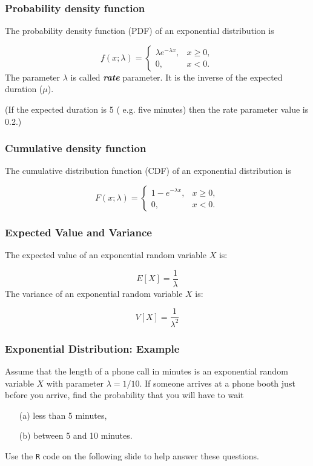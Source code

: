 \documentclass[a4]{beamer}
\begin{document}
\begin{frame}[fragile]
\frametitle{Probability density function}
The probability density function (PDF) of an exponential distribution is

\[
f(x;\lambda) = \begin{cases}
\lambda e^{-\lambda x}, & x \ge 0, \\
0, & x < 0.
\end{cases}\]
The parameter $\lambda$  is called \textbf{\emph{rate}} parameter. It is the inverse of the expected duration ($\mu$).\\ \bigskip

(If the expected duration is 5 ( e.g. five minutes) then the rate parameter value is 0.2.)
\end{frame}

\begin{frame}[fragile]
\frametitle{Cumulative density function}
The cumulative distribution function (CDF) of an exponential distribution is

\[
F(x;\lambda) = \begin{cases}
1-e^{-\lambda x}, & x \ge 0, \\
0, & x < 0.
\end{cases}\]

\end{frame}

\begin{frame}[fragile]
\frametitle{Expected Value and Variance}
The expected value of an exponential random variable $X$ is:

\[
E[X] = \frac{1}{\lambda}\]
The variance of an exponential random variable $X$ is:

\[
V[X] = \frac{1}{\lambda^2}\]

\end{frame}

\begin{frame}[fragile]
\frametitle{Exponential Distribution: Example}
Assume that the length of a phone call in minutes is an exponential random variable $X$ with parameter
$\lambda = 1/10$. If someone arrives at a phone booth just before you arrive, find the probability that you
will have to wait \begin{itemize}
\item[(a)] less than 5 minutes,
\item[(b)] between 5 and 10 minutes.
\end{itemize}
Use the \texttt{R} code on the following slide to help answer these questions.
\end{frame}
\end{document}

